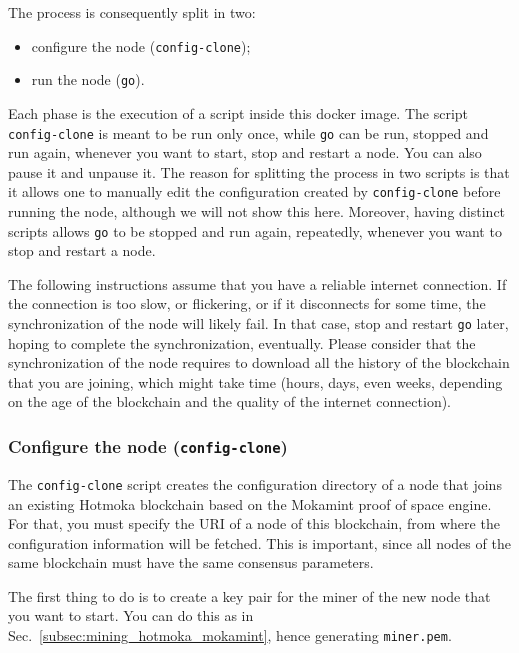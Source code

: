 The process is consequently split in two:
%
\begin{itemize}	
\item configure the node (\texttt{config-clone});
\item run the node (\texttt{go}).
\end{itemize}
%
Each phase is the execution of a script inside this docker image. The script
\texttt{config-clone} is meant to be run only once, while \texttt{go} can be run, stopped and run again,
whenever you want to start, stop and restart a node. You can also pause it and unpause it.
The reason for splitting the process in two scripts is that it allows one
to manually edit the configuration created by \texttt{config-clone} before running the node,
although we will not show this here. Moreover, having distinct scripts allows \texttt{go}
to be stopped and run again, repeatedly, whenever you want to stop and restart a node.

The following instructions assume that you have a reliable internet connection.
If the connection is too slow, or flickering, or if it disconnects for some time,
the synchronization of the node will likely fail. In that case, stop and restart \texttt{go} later, hoping
to complete the synchronization, eventually. Please consider that the synchronization of the node
requires to download all the history of the blockchain that you are joining, which might take time
(hours, days, even weeks, depending on the age of the blockchain and the quality of the internet
connection).

\subsubsection{Configure the node (\texttt{config-clone})}\label{subsubsec:mokamint_config_clone}

The \texttt{config-clone} script creates the configuration directory of a node
that joins an existing Hotmoka blockchain based on the Mokamint proof of space engine.
For that, you must specify the URI of a node of this blockchain, from where
the configuration information will be fetched. This is important, since all nodes of the
same blockchain must have the same consensus parameters.

The first thing to do is to create a key pair for the miner of the new node
that you want to start. You can do this as in Sec.~\ref{subsec:mining_hotmoka_mokamint},
hence generating \texttt{miner.pem}.

